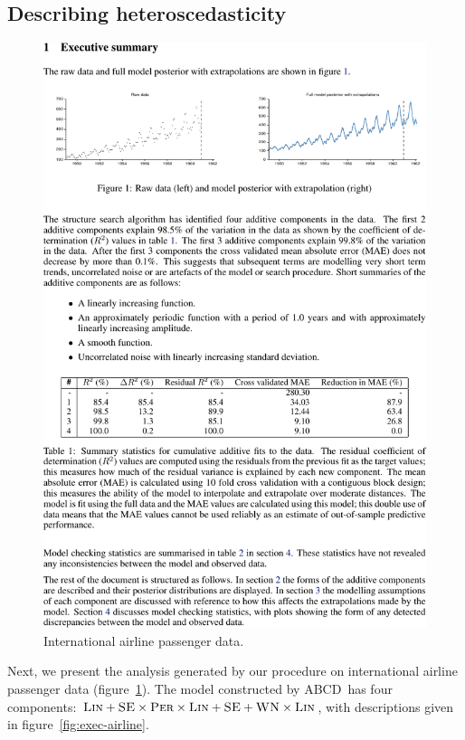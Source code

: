 \documentclass[letterpaper]{article}
\newcommand{\procedurename}{ABCD\ }
\begin{document}


\subsection{Describing heteroscedasticity}
\label{sec:airline}

\begin{figure}[h]
\centering
\includegraphics[trim=0.4cm 16.8cm 8cm 2cm, clip, width=0.98\columnwidth, height=0.45\columnwidth]{airlinepages/pg_0002-crop}
\caption{
International airline passenger data.}
\label{fig:airline}
\end{figure}

Next, we present the analysis generated by our procedure on international airline passenger data (figure~\ref{fig:airline}).
The model constructed by \procedurename has four components: ${\textsc{Lin}} + {\textsc{SE}} \times {\textsc{Per}} \times {\textsc{Lin}} + {\textsc{SE}} + {\textsc{WN}} \times {\textsc{Lin}}$, with descriptions given in figure~\ref{fig:exec-airline}.
\end{document}
